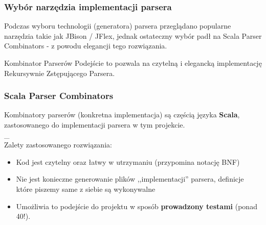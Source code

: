 \documentclass{beamer}
\begin{document}


\begin{frame}
\frametitle{Wybór narzędzia implementacji parsera}
Podczas wyboru technologii (generatora) parsera przeglądano popularne narzędzia takie jak JBison / JFlex,
jednak ostateczny wybór padł na Scala Parser Combinators - z powodu elegancji tego rozwiązania.\\

\pause
\begin{block}{Kombinator Parserów}
 Podejście to pozwala na czytelną i elegancką implementację Rekursywnie Zstępującego Parsera.
\end{block}

\end{frame}



\begin{frame}
\frametitle{Scala Parser Combinators}
Kombinatory parserów (konkretna implementacja) są częścią języka \textbf{Scala}, zastosowanego do implementacji parsera w tym projekcie. \\
\_ \\

Zalety zastosowanego rozwiązania:
\begin{itemize}
 \pause \item Kod jest czytelny oraz łatwy w utrzymaniu (przypomina notację BNF)
 \pause \item Nie jest konieczne generowanie plików ,,implementacji'' parsera, definicje które piszemy same z siebie są wykonywalne
 \pause \item Umożliwia to podejście do projektu w sposób \textbf{prowadzony testami} (ponad 40!).
\end{itemize}


% 
% 
%   

\end{frame}
\end{document}
